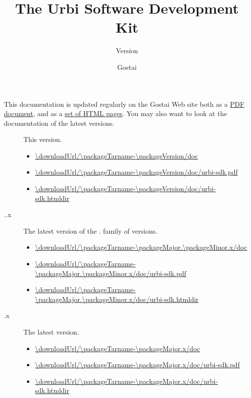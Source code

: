 \documentclass[openright,twoside,11pt,final]{book}
\title{The Urbi Software Development Kit}
\subtitle{Version \VcsDescription}
\author{Gostai}
\begin{document}
\maketitle

This documentation is updated regularly on the Gostai Web site both as a
\href{\docurl/urbi-sdk.pdf}{PDF document}, and as a
\href{\docurl/urbi-sdk.htmldir}{set of HTML pages}.  You may also want to
look at the documentation of the latest versions.

\newcommand{\versionItem}[2]
{
\item[\packageName{} #1] #2.

  \begin{itemize}
  \item \url{\downloadUrl/\packageTarname-#1/doc}
  \item \url{\downloadUrl/\packageTarname-#1/doc/urbi-sdk.pdf}
  \item \url{\downloadUrl/\packageTarname-#1/doc/urbi-sdk.htmldir}
  \end{itemize}
}
\begin{description}
\versionItem{\packageVersion}{This version}
\versionItem{\packageMajor.\packageMinor.x}{The latest version of the
  \packageMajor.\packageMinor{} family of versions}
\versionItem{\packageMajor.x}{The latest version}
\end{description}



\tableofcontents







{
  
}

\end{document}
